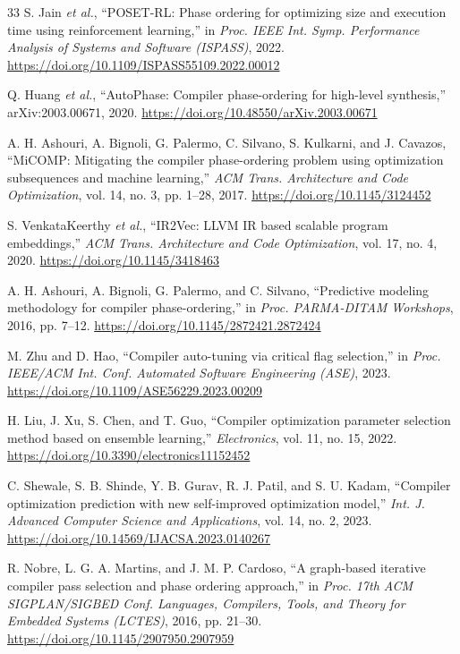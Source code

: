 \documentclass[conference,a4paper]{IEEEtran}
\begin{document}
\begin{thebibliography}{33}
S. Jain \textit{et al.},
``POSET-RL: Phase ordering for optimizing size and execution time using reinforcement learning,''
in \textit{Proc. IEEE Int. Symp. Performance Analysis of Systems and Software (ISPASS)}, 2022.
\url{https://doi.org/10.1109/ISPASS55109.2022.00012}

Q. Huang \textit{et al.},
``AutoPhase: Compiler phase-ordering for high-level synthesis,'' arXiv:2003.00671, 2020.
\url{https://doi.org/10.48550/arXiv.2003.00671}

A. H. Ashouri, A. Bignoli, G. Palermo, C. Silvano, S. Kulkarni, and J. Cavazos,
``MiCOMP: Mitigating the compiler phase-ordering problem using optimization subsequences and machine learning,''
\textit{ACM Trans. Architecture and Code Optimization}, vol. 14, no. 3, pp. 1--28, 2017.
\url{https://doi.org/10.1145/3124452}

S. VenkataKeerthy \textit{et al.},
``IR2Vec: LLVM IR based scalable program embeddings,''
\textit{ACM Trans. Architecture and Code Optimization}, vol. 17, no. 4, 2020.
\url{https://doi.org/10.1145/3418463}

A. H. Ashouri, A. Bignoli, G. Palermo, and C. Silvano,
``Predictive modeling methodology for compiler phase-ordering,''
in \textit{Proc. PARMA-DITAM Workshops}, 2016, pp. 7--12.
\url{https://doi.org/10.1145/2872421.2872424}

M. Zhu and D. Hao,
``Compiler auto-tuning via critical flag selection,''
in \textit{Proc. IEEE/ACM Int. Conf. Automated Software Engineering (ASE)}, 2023.
\url{https://doi.org/10.1109/ASE56229.2023.00209}

H. Liu, J. Xu, S. Chen, and T. Guo,
``Compiler optimization parameter selection method based on ensemble learning,''
\textit{Electronics}, vol. 11, no. 15, 2022.
\url{https://doi.org/10.3390/electronics11152452}

C. Shewale, S. B. Shinde, Y. B. Gurav, R. J. Patil, and S. U. Kadam,
``Compiler optimization prediction with new self-improved optimization model,''
\textit{Int. J. Advanced Computer Science and Applications}, vol. 14, no. 2, 2023.
\url{https://doi.org/10.14569/IJACSA.2023.0140267}

R. Nobre, L. G. A. Martins, and J. M. P. Cardoso,
``A graph-based iterative compiler pass selection and phase ordering approach,''
in \textit{Proc. 17th ACM SIGPLAN/SIGBED Conf. Languages, Compilers, Tools, and Theory for Embedded Systems (LCTES)}, 2016, pp. 21--30.
\url{https://doi.org/10.1145/2907950.2907959}


\end{thebibliography}
\end{document}
